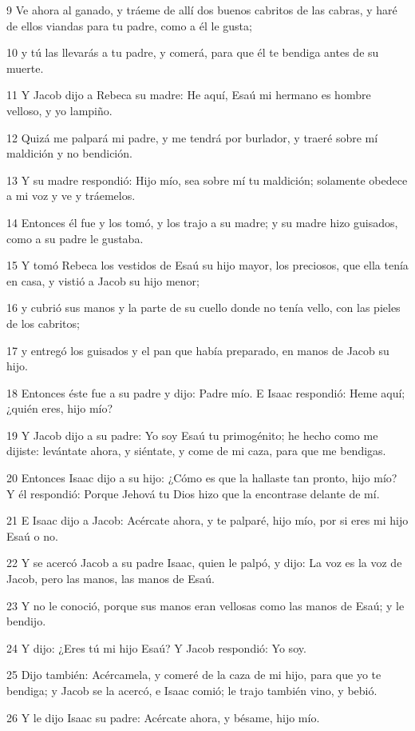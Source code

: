 9 Ve ahora al ganado, y tráeme de allí dos buenos cabritos de las cabras, y haré de ellos viandas para tu padre, como a él le gusta;

10 y tú las llevarás a tu padre, y comerá, para que él te bendiga antes de su muerte.

11 Y Jacob dijo a Rebeca su madre: He aquí, Esaú mi hermano es hombre velloso, y yo lampiño.

12 Quizá me palpará mi padre, y me tendrá por burlador, y traeré sobre mí maldición y no bendición.

13 Y su madre respondió: Hijo mío, sea sobre mí tu maldición; solamente obedece a mi voz y ve y tráemelos.

14 Entonces él fue y los tomó, y los trajo a su madre; y su madre hizo guisados, como a su padre le gustaba.

15 Y tomó Rebeca los vestidos de Esaú su hijo mayor, los preciosos, que ella tenía en casa, y vistió a Jacob su hijo menor;

16 y cubrió sus manos y la parte de su cuello donde no tenía vello, con las pieles de los cabritos;

17 y entregó los guisados y el pan que había preparado, en manos de Jacob su hijo.

18 Entonces éste fue a su padre y dijo: Padre mío. E Isaac respondió: Heme aquí; ¿quién eres, hijo mío?

19 Y Jacob dijo a su padre: Yo soy Esaú tu primogénito; he hecho como me dijiste: levántate ahora, y siéntate, y come de mi caza, para que me bendigas.

20 Entonces Isaac dijo a su hijo: ¿Cómo es que la hallaste tan pronto, hijo mío? Y él respondió: Porque Jehová tu Dios hizo que la encontrase delante de mí.

21 E Isaac dijo a Jacob: Acércate ahora, y te palparé, hijo mío, por si eres mi hijo Esaú o no.

22 Y se acercó Jacob a su padre Isaac, quien le palpó, y dijo: La voz es la voz de Jacob, pero las manos, las manos de Esaú.

23 Y no le conoció, porque sus manos eran vellosas como las manos de Esaú; y le bendijo.

24 Y dijo: ¿Eres tú mi hijo Esaú? Y Jacob respondió: Yo soy.

25 Dijo también: Acércamela, y comeré de la caza de mi hijo, para que yo te bendiga; y Jacob se la acercó, e Isaac comió; le trajo también vino, y bebió.

26 Y le dijo Isaac su padre: Acércate ahora, y bésame, hijo mío.

